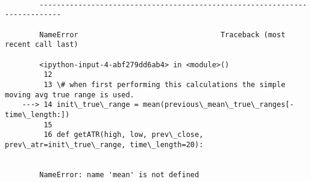 \documentclass[11pt]{article}
\begin{document}
    \begin{Verbatim}[commandchars=\\\{\}]

        ---------------------------------------------------------------------------

        NameError                                 Traceback (most recent call last)

        <ipython-input-4-abf279dd6ab4> in <module>()
         12 
         13 \# when first performing this calculations the simple moving avg true range is used.
    ---> 14 init\_true\_range = mean(previous\_mean\_true\_ranges[-time\_length:])
         15 
         16 def getATR(high, low, prev\_close, prev\_atr=init\_true\_range, time\_length=20):


        NameError: name 'mean' is not defined

    \end{Verbatim}
\end{document}
